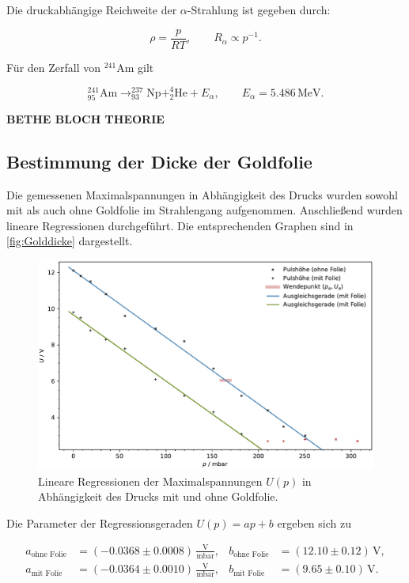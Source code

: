 Die druckabhängige Reichweite der $\alpha$-Strahlung ist gegeben durch:

\[
\rho = \frac{p}{RT}, \qquad R_\alpha \propto p^{-1}.
\]

Für den Zerfall von $^{241}\text{Am}$ gilt

\[
^{241}_{95}\text{Am} \rightarrow ^{237}_{93}\text{Np} + ^4_2\text{He} + E_\alpha, \qquad E_\alpha = 5.486 \, \text{MeV}.
\]

\textbf{BETHE BLOCH THEORIE}

\subsection*{Bestimmung der Dicke der Goldfolie}

Die gemessenen Maximalspannungen in Abhängigkeit des Drucks wurden sowohl mit als auch ohne Goldfolie im Strahlengang aufgenommen.  
Anschließend wurden lineare Regressionen durchgeführt. Die entsprechenden Graphen sind in \autoref{fig:Golddicke} dargestellt.

\begin{figure}[h!]
    \centering
    \includegraphics[width=1\textwidth]{content/messung/Golddicke.pdf}
    \caption{Lineare Regressionen der Maximalspannungen $U(p)$ in Abhängigkeit des Drucks mit und ohne Goldfolie.}
    \label{fig:Golddicke}
\end{figure}

Die Parameter der Regressionsgeraden $U(p) = ap + b$ ergeben sich zu

\begin{align*}
a_{\text{ohne Folie}} &= \left(-0.0368 \pm 0.0008\right) \, \frac{\text{V}}{\text{mbar}}, & b_{\text{ohne Folie}} &= \left(12.10 \pm 0.12\right) \, \text{V}, \\
a_{\text{mit Folie}} &= \left(-0.0364 \pm 0.0010\right) \, \frac{\text{V}}{\text{mbar}}, & b_{\text{mit Folie}} &= \left(9.65 \pm 0.10\right) \, \text{V}.
\end{align*}

